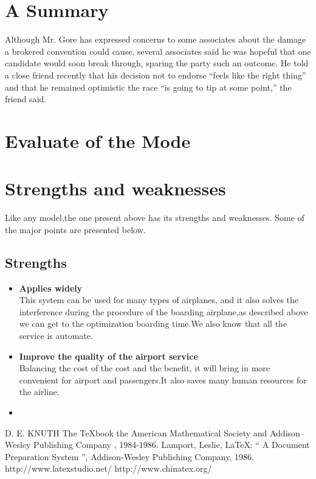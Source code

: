 \section{A Summary    }
Although Mr. Gore has expressed concerns to some associates about
the damage a brokered convention could cause, several associates
said he was hopeful that one candidate would soon break through,
sparing the party such an outcome. He told a close friend recently
that his decision not to endorse “feels like the right thing”
and that he remained optimistic the race “is going to tip at some
point,” the friend said.
\section{Evaluate of the Mode}

\section{Strengths and weaknesses}
Like any model,the one present above has its strengths and
weaknesses. Some of the major points are presented below.

\subsection{Strengths}
\begin{itemize}
\item \textbf{Applies widely}\\
This  system can be used for many types of airplanes, and it also
solves the interference during  the procedure of the boarding
airplane,as described above we can get to the  optimization
boarding time.We also know that all the service is automate.
\item \textbf{Improve the quality of the airport service}\\
Balancing the cost of the cost and the benefit, it will bring in
more convenient  for airport and passengers.It also saves many
human resources for the airline. \item \textbf{}
\end{itemize}




\begin{thebibliography}{99}
 D. E. KNUTH   The \TeX{}book  the American
Mathematical Society and Addison–Wesley
Publishing Company , 1984-1986.
Lamport, Leslie,  \LaTeX{}: `` A Document Preparation System '',
Addison-Wesley Publishing Company, 1986.
http://www.latexstudio.net/
http://www.chinatex.org/
\end{thebibliography}


